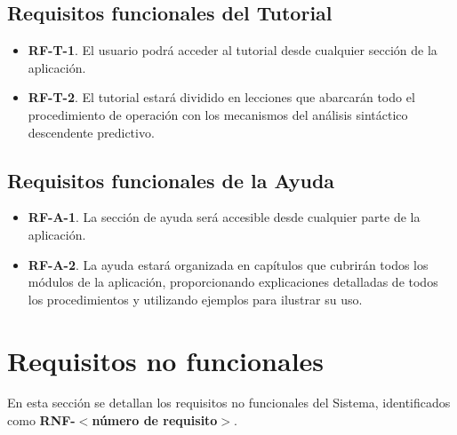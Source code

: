 \subsection{Requisitos funcionales del Tutorial}

\begin{itemize}
    \item \textbf{RF-T-1}. El usuario podrá acceder al tutorial desde cualquier sección de la aplicación.
    \item \textbf{RF-T-2}. El tutorial estará dividido en lecciones que abarcarán todo el procedimiento de operación con los mecanismos del análisis sintáctico descendente predictivo.
\end{itemize}

\subsection{Requisitos funcionales de la Ayuda}

\begin{itemize}
    \item \textbf{RF-A-1}. La sección de ayuda será accesible desde cualquier parte de la aplicación.
    \item \textbf{RF-A-2}. La ayuda estará organizada en capítulos que cubrirán todos los módulos de la aplicación, proporcionando explicaciones detalladas de todos los procedimientos y utilizando ejemplos para ilustrar su uso.
\end{itemize}


\section{Requisitos no funcionales}
 En esta sección se detallan los requisitos no funcionales del Sistema, identificados como \textbf{RNF-$<$número de requisito$>$}.

